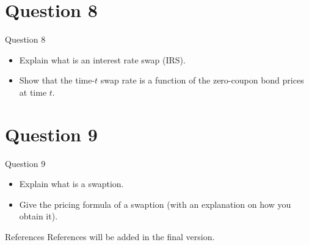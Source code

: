 \documentclass[compress]{beamer}
\begin{document}

\section{Question 8}

\begin{frame}{Question 8}
    \begin{itemize}
        \item[(i)] Explain what is an interest rate swap (IRS).
        \item[(ii)] Show that the time-$t$ swap rate is a function of the zero-coupon bond prices at time $t$.
    \end{itemize}
\end{frame}


\section{Question 9}

\begin{frame}{Question 9}
    \begin{itemize}
        \item[(i)] Explain what is a swaption.
        \item[(ii)] Give the pricing formula of a swaption (with an explanation on how you obtain it).
    \end{itemize}
\end{frame}


\begin{frame}[allowframebreaks]{References}
    References will be added in the final version.
\end{frame}
\end{document}

